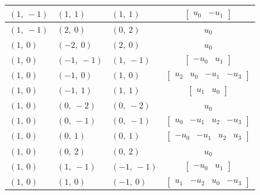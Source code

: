 \documentclass[11pt]{article}
\theoremstyle{definition}
\begin{document}
\begin{longtable}{|l|l|l|c|}
    \hline
    $\left( 1, \  -1\right)$ & $\left( 1, \  1\right)$ & $\left( 1, \  1\right)$ & $\left[\begin{matrix}u_{0} & - u_{1}\end{matrix}\right]$ \\
    \hline
    $\left( 1, \  -1\right)$ & $\left( 2, \  0\right)$ & $\left( 0, \  2\right)$ & $u_{0}$ \\
    \hline
    $\left( 1, \  0\right)$ & $\left( -2, \  0\right)$ & $\left( 2, \  0\right)$ & $u_{0}$ \\
    \hline
    $\left( 1, \  0\right)$ & $\left( -1, \  -1\right)$ & $\left( 1, \  -1\right)$ & $\left[\begin{matrix}- u_{0} & u_{1}\end{matrix}\right]$ \\
    \hline
    $\left( 1, \  0\right)$ & $\left( -1, \  0\right)$ & $\left( 1, \  0\right)$ & $\left[\begin{matrix}u_{2} & u_{0} & - u_{1} & - u_{3}\end{matrix}\right]$ \\
    \hline
    $\left( 1, \  0\right)$ & $\left( -1, \  1\right)$ & $\left( 1, \  1\right)$ & $\left[\begin{matrix}u_{1} & u_{0}\end{matrix}\right]$ \\
    \hline
    $\left( 1, \  0\right)$ & $\left( 0, \  -2\right)$ & $\left( 0, \  -2\right)$ & $u_{0}$ \\
    \hline
    $\left( 1, \  0\right)$ & $\left( 0, \  -1\right)$ & $\left( 0, \  -1\right)$ & $\left[\begin{matrix}u_{0} & - u_{1} & u_{2} & - u_{3}\end{matrix}\right]$ \\
    \hline
    $\left( 1, \  0\right)$ & $\left( 0, \  1\right)$ & $\left( 0, \  1\right)$ & $\left[\begin{matrix}- u_{0} & - u_{1} & u_{2} & u_{3}\end{matrix}\right]$ \\
    \hline
    $\left( 1, \  0\right)$ & $\left( 0, \  2\right)$ & $\left( 0, \  2\right)$ & $u_{0}$ \\
    \hline
    $\left( 1, \  0\right)$ & $\left( 1, \  -1\right)$ & $\left( -1, \  -1\right)$ & $\left[\begin{matrix}- u_{0} & u_{1}\end{matrix}\right]$ \\
    \hline
    $\left( 1, \  0\right)$ & $\left( 1, \  0\right)$ & $\left( -1, \  0\right)$ & $\left[\begin{matrix}u_{1} & - u_{2} & u_{0} & - u_{3}\end{matrix}\right]$ \\

\end{longtable}
\end{document}
